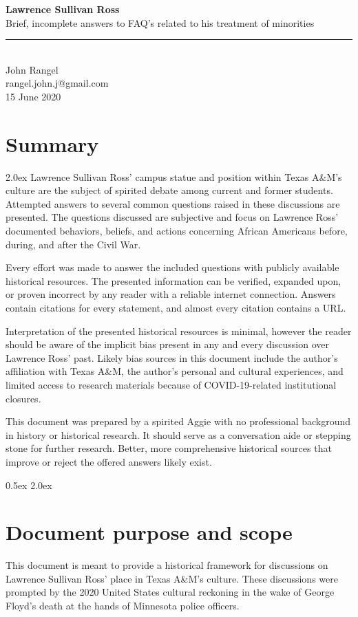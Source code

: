 \documentclass[12pt]{article}
\begin{document}
\Large{\textbf{Lawrence Sullivan Ross \\}}
\large{Brief, incomplete answers to FAQ's related to his treatment of minorities \\}
\rule{\textwidth}{1pt}
\\John Rangel\\rangel.john.j@gmail.com\\15 June 2020
\section{Summary}
\parskip 2.0ex
Lawrence Sullivan Ross' campus statue and position within Texas A\&M's culture are the subject of spirited debate among current and former students. Attempted answers to several common questions raised in these discussions are presented. The questions discussed are subjective and focus on Lawrence Ross' documented behaviors, beliefs, and actions concerning African Americans before, during, and after the Civil War. 

Every effort was made to answer the included questions with publicly available historical resources. The presented information can be verified, expanded upon, or proven incorrect by any reader with a reliable internet connection. Answers contain citations for every statement, and almost every citation contains a URL. 

Interpretation of the presented historical resources is minimal, however the reader should be aware of the implicit bias present in any and every discussion over Lawrence Ross' past. Likely bias sources in this document include the author's affiliation with Texas A\&M, the author's personal and cultural experiences, and limited access to research materials because of COVID-19-related institutional closures.

This document was prepared by a spirited Aggie with no professional background in history or  historical research. It should serve as a conversation aide or stepping stone for further research. Better, more comprehensive historical sources that improve or reject the offered answers likely exist. 

\parskip 0.5ex
\newpage
\tableofcontents
\parskip 2.0ex

\newpage
\section{Document purpose and scope}
This document is meant to provide a historical framework for discussions on Lawrence Sullivan Ross' place in Texas A\&M's culture. These discussions were prompted by the 2020 United States cultural reckoning in the wake of George Floyd's death at the hands of Minnesota police officers. 
\end{document}
